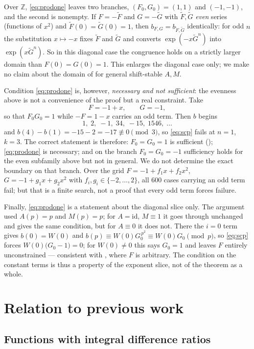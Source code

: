 \documentclass[11pt,a4paper]{article}
\theoremstyle{plain}
\theoremstyle{definition}
\newcommand{\Z}{\mathbb{Z}}
\begin{document}
Over $\Z$, \eqref{eq:prodone} leaves two branches, $(F_0,G_0)=(1,1)$ and $(-1,-1)$, and
the second is nonempty. If $F=-\widetilde F$ and $G=-\widetilde G$ with
$\widetilde F,\widetilde G$ \emph{even} series (functions of $x^{2}$) and
$\widetilde F(0)=\widetilde G(0)=1$, then $b_{F,G}=b_{\widetilde F,\widetilde G}$
identically: for odd $n$ the substitution $x\mapsto -x$ fixes $\widetilde F$ and
$\widetilde G$ and converts $\exp(-x\widetilde G^{n})$ into $\exp(x\widetilde G^{n})$.
So in this diagonal case the congruence holds on a strictly larger domain than
$F(0)=G(0)=1$. This enlarges the diagonal case only; we make no claim about the domain of
 for general shift-stable $A,M$.

Condition \eqref{eq:prodone} is, however, \emph{necessary and not sufficient}: the
evenness above is not a convenience of the proof but a real constraint. Take
\[
  F=-1+x,\qquad G=-1,
\]
so that $F_0G_0=1$ while $-F=1-x$ carries an odd term. Then $b$ begins
\[
  1,\;2,\;-1,\;34,\;-15,\;1546,\;\dots
\]
and $b(4)-b(1)=-15-2=-17\not\equiv0\pmod 3$, so \eqref{eq:scp} fails at $n=1$, $k=3$.
The correct statement is therefore: $F_0=G_0=1$ is sufficient ();
\eqref{eq:prodone} is necessary; and on the branch $F_0=G_0=-1$ sufficiency holds for the
even subfamily above but not in general. We do not determine the exact boundary on that
branch. Over the grid $F=-1+f_1x+f_2x^{2}$, $G=-1+g_1x+g_2x^{2}$ with
$f_i,g_i\in\{-2,\dots,2\}$, all $600$ cases carrying an odd term fail; but that is a
finite search, not a proof that every odd term forces failure.

Finally, \eqref{eq:prodone} is a statement about the diagonal slice only. The argument
used $A(p)=p$ and $M(p)=p$; for $A=\mathrm{id}$, $M\equiv1$ it goes through unchanged and
gives the same condition, but for $A\equiv0$ it does not. There the $i=0$ term gives
$b(0)=W(0)$ and $b(p)\equiv W(0)G_0^{\,p^{2}}\equiv W(0)G_0 \pmod p$, so \eqref{eq:scp}
forces $W(0)\big(G_0-1\big)=0$; for $W(0)\ne0$ this says $G_0=1$ and leaves $F$ entirely
unconstrained --- consistent with , where $F$ is arbitrary. The
condition on the constant terms is thus a property of the exponent slice, not of the
theorem as a whole.

\section{Relation to previous work}\label{sec:prior}

\subsection{Functions with integral difference ratios}
\end{document}

